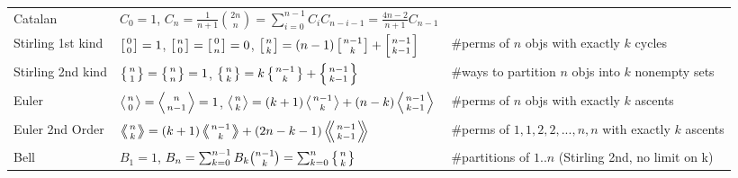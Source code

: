 \documentclass[12pt,a4paper,landscape]{amsart}
\begin{document}
\begin{multicols*}{3}
	\newpage
	\begin{tabular}{@{}l|l|l@{}}
		\toprule
		Catalan	&	$C_0=1$, $C_n=\frac{1}{n+1}\binom{2n}{n} = \sum_{i=0}^{n-1}C_iC_{n-i-1} = \frac{4n-2}{n+1}C_{n-1}$  & \\
		Stirling 1st kind & $\left[{0\atop 0}\right]=1$, $\left[{n\atop 0}\right]=\left[{0\atop n}\right]=0$, $\left[{n\atop k}\right]=(n-1)\left[{n-1\atop k}\right]+\left[{n-1\atop k-1}\right]$ & \#perms of $n$ objs with exactly $k$ cycles\\
		Stirling 2nd kind & $\left\{{n\atop 1}\right\}=\left\{{n\atop n}\right\}=1$, $\left\{{n\atop k}\right\} = k \left\{{ n-1 \atop k }\right\} + \left\{{n-1\atop k-1}\right\}$ & \#ways to partition $n$ objs into $k$ nonempty sets\\
		Euler	& $\left \langle {n\atop 0} \right \rangle = \left \langle {n\atop n-1} \right \rangle = 1 $, $\left \langle {n\atop k} \right \rangle = (k+1) \left \langle {n-1\atop {k}} \right \rangle + (n-k)\left \langle {{n-1}\atop {k-1}} \right \rangle$ & \#perms of $n$ objs with exactly $k$ ascents \\
		Euler 2nd Order &  $\left \langle \!\!\left \langle {n\atop k} \right \rangle \!\! \right \rangle = (k+1) \left \langle \!\! \left \langle {{n-1}\atop {k}} \right \rangle \!\! \right \rangle +(2n-k-1)\left \langle \!\! \left \langle {{n-1}\atop {k-1}} \right \rangle  \!\! \right \rangle$ & \#perms of ${1,1,2,2,...,n,n}$ with exactly $k$ ascents \\
		Bell & $B_1 = 1$, $B_n = \sum_{k=0}^{n-1} B_k \binom{n-1}{k} = \sum_{k=0}^n\left\{{n\atop k}\right\}$ & \#partitions of $1..n$ (Stirling 2nd, no limit on k)\\
		\bottomrule
	\end{tabular}


\end{multicols*}
\end{document}
